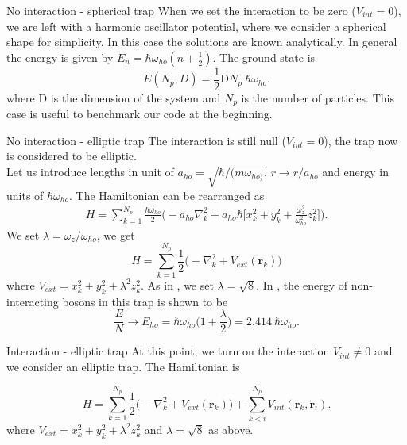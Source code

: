 \documentclass[10pt]{beamer}
\begin{document}
\begin{frame}[fragile]{No interaction - spherical trap}
	When we set the interaction to be zero ($V_{int}=0$), we are left with a harmonic oscillator potential, where we consider a spherical shape for simplicity. In this case the solutions are known analytically. In general the energy is given by $E_n=\hbar\omega_{ho}(n+\frac{1}{2})$. The ground state is 
	\begin{equation*}
	E(N_p,D) = \frac{1}{2}\text{D} N_p\ \hbar\omega_{ho}.
	\label{analitica}
	\end{equation*}
	where D is the dimension of the system and $N_p$ is the number of particles. This case is useful to benchmark our code at the beginning.
\end{frame} 

\begin{frame}[fragile]{No interaction - elliptic trap}
	The interaction is still null ($V_{int}=0$), the trap now is considered to be elliptic.\\
	Let us introduce lengths in unit of $a_{ho}=\sqrt{\hbar/(m\omega_{ho)}}$, $r\rightarrow r/a_{ho}$ and energy in units of $\hbar\omega_{ho}$. The Hamiltonian can be rearranged as 
	\begin{equation*}
	\begin{split}
	H=\sum_{k=1}^{N_p}\frac{\hbar \omega_{ho}}{2}\bigg(-a_{ho}\nabla^2_{k}+a_{ho}{\hbar}\bigg[x^2_k+y^2_k+\frac{\omega^{2}_{z}}{\omega^{2}_{ho}}z^2_k\bigg]\bigg).
	\end{split}
	\end{equation*}
	We set $\lambda=\omega_z/\omega_{ho}$, we get
	\begin{equation}
	\label{ham}
	H=\sum_{k=1}^{N_p}\frac{1}{2}\bigg(-\nabla^2_{k}+V_{ext}(\mathbf{r}_k)\bigg)
	\end{equation}
	where $V_{ext}=x^2_k+y^2_k+\lambda^2 z^2_k$. As in \cite{DalfString}, we set $\lambda=\sqrt{8}$. In \cite{vmcarticle}, the energy of non-interacting bosons in this trap is shown to be
	\begin{equation*}
	\frac{E}{N}\rightarrow E_{ho}=\hbar\omega_{ho}\bigg(1+\frac{\lambda}{2}\bigg)=2.414\ \hbar\omega_{ho}.
	\end{equation*}
\end{frame}


\begin{frame}[fragile]{Interaction - elliptic trap}
At this point, we turn on the interaction $V_{int}\neq 0$ and we consider an elliptic trap. The Hamiltonian is

\begin{equation}
\label{ham2}
H=\sum_{k=1}^{N_p}\frac{1}{2}\bigg(-\nabla^2_{k}+V_{ext}(\mathbf{r}_k)\bigg)+\sum_{k<i}^{N_p} V_{int}(\mathbf{r}_k,\mathbf{r}_i).
\end{equation}
where $V_{ext}=x^2_k+y^2_k+\lambda^2 z^2_k$ and $\lambda=\sqrt{8}$ as above.	
\end{frame}
\end{document}
